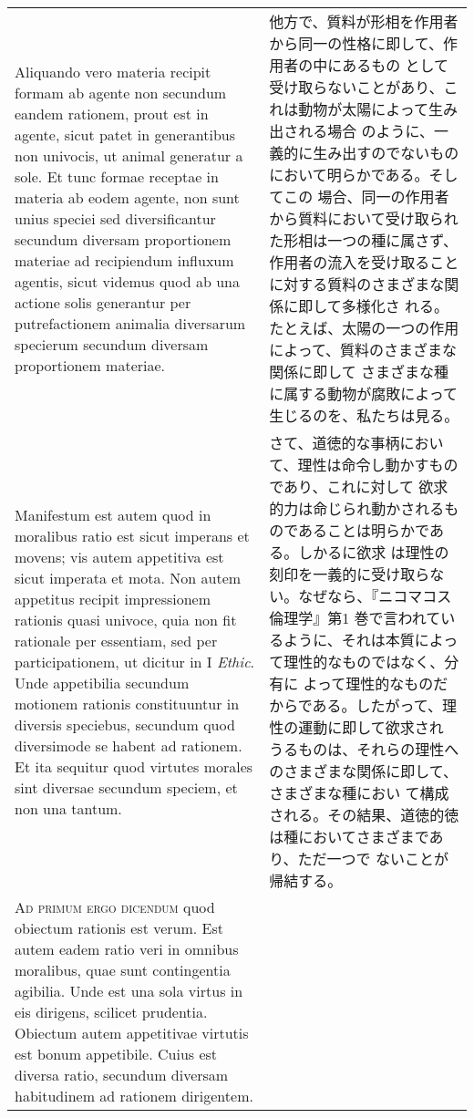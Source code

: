 \documentclass[10pt]{jsarticle}
\begin{document}
\begin{longtable}{p{21em}p{21em}}
 Aliquando vero materia recipit formam ab agente non secundum eandem
 rationem, prout est in agente, sicut patet in generantibus non
 univocis, ut animal generatur a sole. Et tunc formae receptae in
 materia ab eodem agente, non sunt unius speciei sed diversificantur
 secundum diversam proportionem materiae ad recipiendum influxum
 agentis, sicut videmus quod ab una actione solis generantur per
 putrefactionem animalia diversarum specierum secundum diversam
 proportionem materiae.

&

他方で、質料が形相を作用者から同一の性格に即して、作用者の中にあるもの
として受け取らないことがあり、これは動物が太陽によって生み出される場合
のように、一義的に生み出すのでないものにおいて明らかである。そしてこの
場合、同一の作用者から質料において受け取られた形相は一つの種に属さず、
作用者の流入を受け取ることに対する質料のさまざまな関係に即して多様化さ
れる。たとえば、太陽の一つの作用によって、質料のさまざまな関係に即して
さまざまな種に属する動物が腐敗によって生じるのを、私たちは見る。

\\



 Manifestum est autem quod in moralibus ratio est sicut imperans et
 movens; vis autem appetitiva est sicut imperata et mota. Non autem
 appetitus recipit impressionem rationis quasi univoce, quia non fit
 rationale per essentiam, sed per participationem, ut dicitur in I
 {\itshape Ethic}. Unde appetibilia secundum motionem rationis
 constituuntur in diversis speciebus, secundum quod diversimode se
 habent ad rationem. Et ita sequitur quod virtutes morales sint
 diversae secundum speciem, et non una tantum.

&

さて、道徳的な事柄において、理性は命令し動かすものであり、これに対して
欲求的力は命じられ動かされるものであることは明らかである。しかるに欲求
は理性の刻印を一義的に受け取らない。なぜなら、『ニコマコス倫理学』第1
巻で言われているように、それは本質によって理性的なものではなく、分有に
よって理性的なものだからである。したがって、理性の運動に即して欲求され
うるものは、それらの理性へのさまざまな関係に即して、さまざまな種におい
て構成される。その結果、道徳的徳は種においてさまざまであり、ただ一つで
ないことが帰結する。

\\



{\scshape Ad primum ergo dicendum} quod obiectum rationis est
verum. Est autem eadem ratio veri in omnibus moralibus, quae sunt
contingentia agibilia. Unde est una sola virtus in eis dirigens,
scilicet prudentia. Obiectum autem appetitivae virtutis est bonum
appetibile. Cuius est diversa ratio, secundum diversam habitudinem ad
rationem dirigentem.


\end{longtable}
\end{document}
